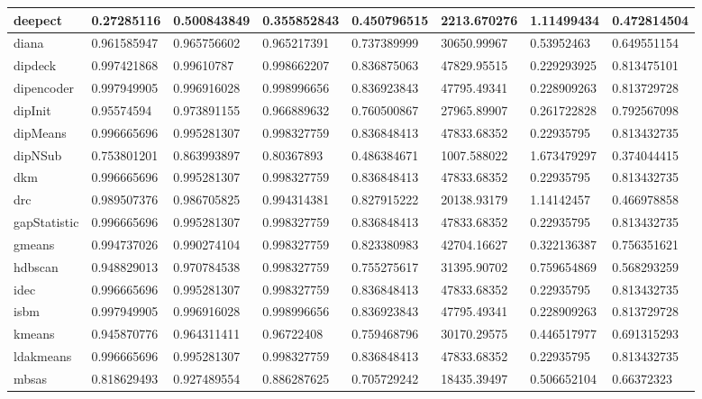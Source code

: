 \begin{table}[H]
\begin{tabular}{|l|l|l|l|l|l|l|l|}
\hline
deepect & 0.27285116 & 0.500843849 & 0.355852843 & 0.450796515 & 2213.670276 & 1.11499434 & 0.472814504 \\
\hline
diana & 0.961585947 & 0.965756602 & 0.965217391 & 0.737389999 & 30650.99967 & 0.53952463 & 0.649551154 \\
\hline
dipdeck & 0.997421868 & 0.99610787 & 0.998662207 & 0.836875063 & 47829.95515 & 0.229293925 & 0.813475101 \\
\hline
dipencoder & 0.997949905 & 0.996916028 & 0.998996656 & 0.836923843 & 47795.49341 & 0.228909263 & 0.813729728 \\
\hline
dipInit & 0.95574594 & 0.973891155 & 0.966889632 & 0.760500867 & 27965.89907 & 0.261722828 & 0.792567098 \\
\hline
dipMeans & 0.996665696 & 0.995281307 & 0.998327759 & 0.836848413 & 47833.68352 & 0.22935795 & 0.813432735 \\
\hline
dipNSub & 0.753801201 & 0.863993897 & 0.80367893 & 0.486384671 & 1007.588022 & 1.673479297 & 0.374044415 \\
\hline
dkm & 0.996665696 & 0.995281307 & 0.998327759 & 0.836848413 & 47833.68352 & 0.22935795 & 0.813432735 \\
\hline
drc & 0.989507376 & 0.986705825 & 0.994314381 & 0.827915222 & 20138.93179 & 1.14142457 & 0.466978858 \\
\hline
gapStatistic & 0.996665696 & 0.995281307 & 0.998327759 & 0.836848413 & 47833.68352 & 0.22935795 & 0.813432735 \\
\hline
gmeans & 0.994737026 & 0.990274104 & 0.998327759 & 0.823380983 & 42704.16627 & 0.322136387 & 0.756351621 \\
\hline
hdbscan & 0.948829013 & 0.970784538 & 0.998327759 & 0.755275617 & 31395.90702 & 0.759654869 & 0.568293259 \\
\hline
idec & 0.996665696 & 0.995281307 & 0.998327759 & 0.836848413 & 47833.68352 & 0.22935795 & 0.813432735 \\
\hline
isbm & 0.997949905 & 0.996916028 & 0.998996656 & 0.836923843 & 47795.49341 & 0.228909263 & 0.813729728 \\
\hline
kmeans & 0.945870776 & 0.964311411 & 0.96722408 & 0.759468796 & 30170.29575 & 0.446517977 & 0.691315293 \\
\hline
ldakmeans & 0.996665696 & 0.995281307 & 0.998327759 & 0.836848413 & 47833.68352 & 0.22935795 & 0.813432735 \\
\hline
mbsas & 0.818629493 & 0.927489554 & 0.886287625 & 0.705729242 & 18435.39497 & 0.506652104 & 0.66372323 \\

\end{tabular}
\end{table}
